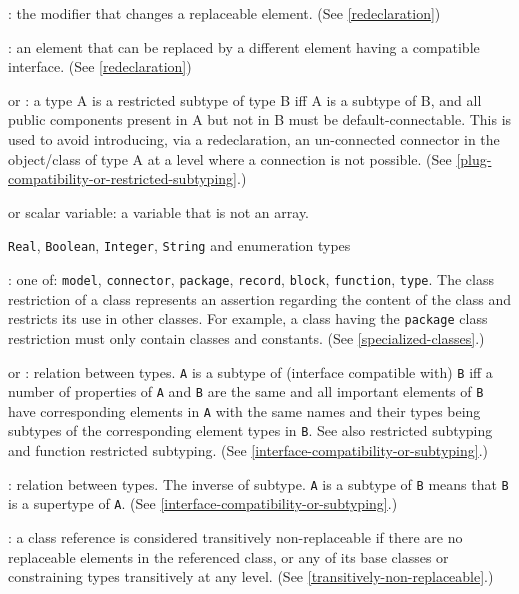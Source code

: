 : the modifier that changes a replaceable element.
(See \cref{redeclaration})

: an element that can be replaced by a different
element having a compatible interface. (See \cref{redeclaration})

 or : a type A
is a restricted subtype of type B iff A is a subtype of B, and all
public components present in A but not in B must be default-connectable.
This is used to avoid introducing, via a redeclaration, an un-connected
connector in the object/class of type A at a level where a connection is
not possible. (See \cref{plug-compatibility-or-restricted-subtyping}.)

 or scalar variable: a variable that is not an array.

 \lstinline!Real!, \lstinline!Boolean!, \lstinline!Integer!, \lstinline!String! and enumeration types

: one of: \lstinline!model!, \lstinline!connector!, \lstinline!package!, \lstinline!record!, \lstinline!block!, \lstinline!function!, \lstinline!type!.  The class restriction of a class represents an assertion regarding the content of the class and restricts its use in other classes.  For example, a class having the \lstinline!package! class restriction must only contain classes and constants.  (See \cref{specialized-classes}.)

 or : relation between types.  \lstinline!A! is a subtype of (interface compatible with) \lstinline!B! iff a number of properties of \lstinline!A! and \lstinline!B! are the same and all important elements of \lstinline!B! have corresponding elements in \lstinline!A! with the same names and their types being subtypes of the corresponding element types in \lstinline!B!. See also restricted subtyping and function restricted subtyping. (See \cref{interface-compatibility-or-subtyping}.)

: relation between types.  The inverse of subtype.  \lstinline!A! is a subtype of \lstinline!B! means that \lstinline!B! is a supertype of \lstinline!A!. (See \cref{interface-compatibility-or-subtyping}.)

: a class reference is considered
transitively non-replaceable if there are no replaceable elements in the
referenced class, or any of its base classes or constraining types
transitively at any level. (See \cref{transitively-non-replaceable}.)


